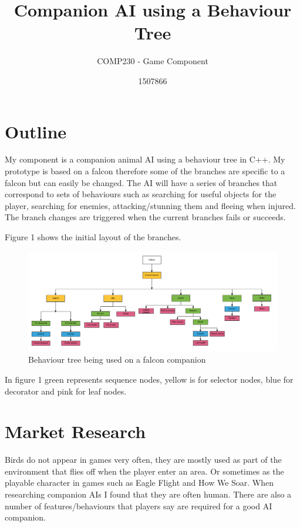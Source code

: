 \documentclass{scrartcl}
\title{ Companion AI using a Behaviour Tree }
\subtitle{COMP230 - Game Component}
\author{1507866}
\begin{document}
	
\maketitle
	
\section{Outline}

My component is a companion animal AI using a behaviour tree in C++. My prototype is based on a falcon therefore some of the branches are specific to a falcon but can easily be changed. The AI will have a series of branches that correspond to sets of behaviours such as searching  for useful objects for the player, searching for enemies, attacking/stunning them and fleeing when injured.  The branch changes are triggered when the current branches fails or succeeds.

Figure 1 shows the initial layout of the branches.  

\begin{figure}[h]
	\includegraphics[width=1.2\linewidth]{behaviour_tree.png}
	\caption{ Behaviour tree being used on a falcon companion}
\end{figure} 

In figure 1 green represents sequence nodes, yellow is for selector nodes, blue for decorator and pink for leaf nodes.
 
\newpage

\section{Market Research}

Birds do not appear in games very often, they are mostly used as part of the environment that flies off when the player enter an area. Or sometimes as the playable character in games such as Eagle Flight and How We Soar. 
When researching companion AIs I found that they are often human. There are also a number of features/behaviours that players say are required for a good AI companion. 
\end{document}
